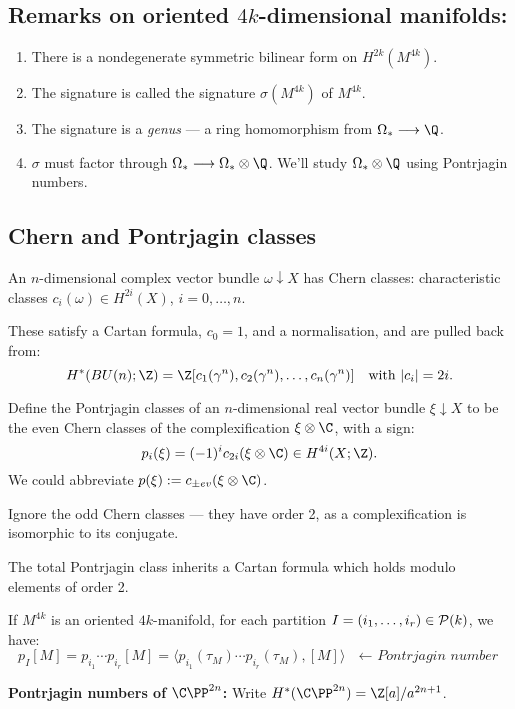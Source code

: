 \documentclass[11pt]{article}
\begin{document}
\begin{SignatureThmTalk}
\subsection*{Remarks on oriented $4k$-dimensional manifolds:}
\begin{enumerate}
\item There is a nondegenerate symmetric bilinear form on $H^{2k}(M^{4k})$.
\item The signature is called the signature $\sigma(M^{4k})$ of $M^{4k}$. 
\item The signature is a \emph{genus} --- a ring homomorphism from $\Omega_*\to\Q$.
\item $\sigma$ must factor through $\Omega_*\to\Omega_*\otimes\Q$. We'll study $\Omega_*\otimes \Q$ using Pontrjagin numbers.
\end{enumerate}
\subsection*{Chern and Pontrjagin classes}
\begin{itemise}
\item An $n$-dimensional complex vector bundle $\omega\downarrow X$ has Chern classes: characteristic classes $c_i(\omega)\in H^{2i}(X)$, $i=0,\ldots,n$.
\item These satisfy a Cartan formula, $c_0=1$, and a normalisation, and are pulled back from:
\[H^*(BU(n);\Z)=\Z[c_1(\gamma^n),c_2(\gamma^n),\ldots,c_n(\gamma^n)]\text{\quad with $|c_i|=2i$.}\]
\item Define the Pontrjagin classes of an $n$-dimensional real vector bundle $\xi\downarrow X$ to be the even Chern classes of the complexification $\xi\otimes\C$, with a sign:
\[p_i(\xi)=(-1)^ic_{2i}(\xi\otimes\C)\in H^{4i}(X;\Z).\]
We could abbreviate $p(\xi):=c_{\pm ev}(\xi\otimes\C)$.
\item Ignore the odd Chern classes --- they have order 2, as a complexification is isomorphic to its conjugate.
\item The total Pontrjagin class inherits a Cartan formula which holds modulo elements of order 2.
\item If $M^{4k}$ is an oriented $4k$-manifold, for each partition $I=(i_1,\ldots,i_r)\in\mathcal{P}(k)$, we have:
\[p_I[M]=p_{i_1}\cdots p_{i_r}[M]=\langle p_{i_1}(\tau_M)\cdots p_{i_r}(\tau_M),[M]\rangle\textit{\ \ $\leftarrow$ Pontrjagin number}\]
\item \textbf{Pontrjagin numbers of $\CP^{2n}$:} Write $H^*(\CP^{2n})=\Z[a]/a^{2n+1}$.\\

\end{itemise}
\end{SignatureThmTalk}
\end{document}
